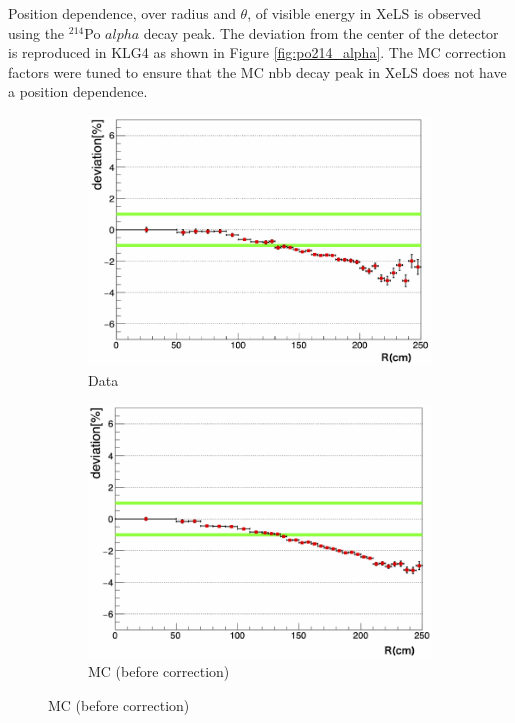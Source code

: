 Position dependence, over radius and $\theta$, of visible energy in XeLS is observed using the $^{214}$Po $alpha$ decay peak. The deviation from the center of the detector is reproduced in KLG4 as shown in Figure \ref{fig:po214_alpha}. The MC correction factors were tuned to ensure that the MC \0nbb decay peak in XeLS does not have a position dependence.

\begin{figure}[htb]
\centering
\begin{subfigure}[b]{0.45\textwidth}
    \centering
    \includegraphics[width=\textwidth]{po214_data.png}
    \caption{Data}
    \label{fig:po214_data}
\end{subfigure}
\hfill
\begin{subfigure}[b]{0.45\textwidth}
    \centering
    \includegraphics[width=\textwidth]{po214_mc.png}
    \caption{MC (before correction)}
    \label{fig:po214_mc_before}
\end{subfigure}


\end{figure}

